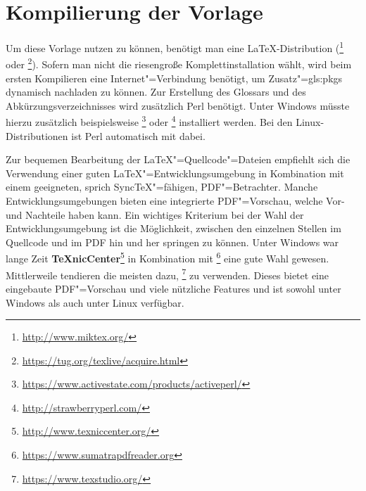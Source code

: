 \section{Kompilierung der Vorlage}%
\label{sec:Kompilierung}
%
Um diese Vorlage nutzen zu können, benötigt man eine \LaTeX-Distribution (\zB {}\footnote{\url{http://www.miktex.org/}} oder \footnote{\url{https://tug.org/texlive/acquire.html}}).
Sofern man nicht die riesengroße Komplettinstallation wählt, wird beim ersten Kompilieren eine Internet"=Verbindung benötigt, um Zusatz"=\glspl{gls:pkg} dynamisch nachladen zu können.
Zur Erstellung des Glossars und des Abkürzungsverzeichnisses wird zusätzlich Perl benötigt.
Unter Windows müsste hierzu zusätzlich beispielsweise \footnote{\url{https://www.activestate.com/products/activeperl/}}
oder \footnote{\url{http://strawberryperl.com/}} installiert werden.
Bei den Linux-Distributionen ist Perl automatisch mit dabei.

Zur bequemen Bearbeitung der \LaTeX"=Quellcode"=Dateien empfiehlt sich die Verwendung einer guten \LaTeX"=Entwicklungsumgebung in Kombination mit einem geeigneten, sprich SyncTeX"=fähigen, PDF"=Betrachter.
Manche Entwicklungsumgebungen bieten eine integrierte PDF"=Vorschau, welche Vor- und Nachteile haben kann.
Ein wichtiges Kriterium bei der Wahl der Entwicklungsumgebung ist die Möglichkeit, zwischen den einzelnen Stellen im Quellcode und im PDF hin und her springen zu können.
Unter Windows war lange Zeit \textbf{TeXnicCenter}\footnote{\url{http://www.texniccenter.org/}} in Kombination mit \footnote{\url{https://www.sumatrapdfreader.org}} eine gute Wahl gewesen.
Mittlerweile tendieren die meisten dazu, \footnote{\url{https://www.texstudio.org/}} zu verwenden.
Dieses bietet eine eingebaute PDF"=Vorschau und viele nützliche Features und ist sowohl unter Windows als auch unter Linux verfügbar.

